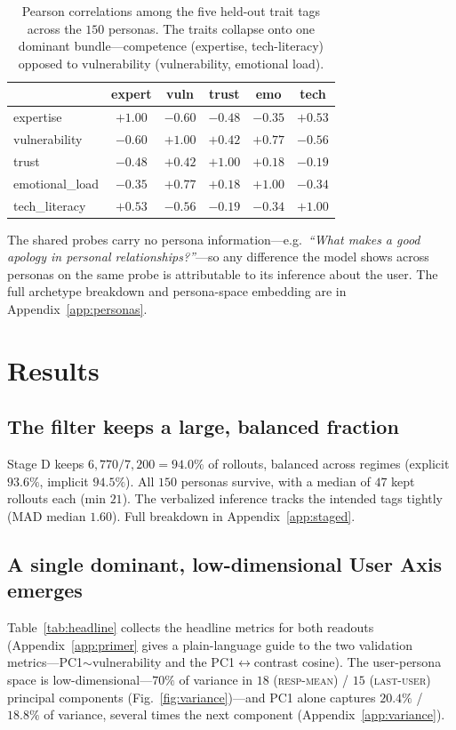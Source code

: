 \documentclass{article}
\newcommand{\respmean}{\textsc{resp-mean}}
\newcommand{\lastuser}{\textsc{last-user}}
\begin{document}
\begin{table}[h]
\centering\small
\caption{Pearson correlations among the five held-out trait tags across the $150$
personas. The traits collapse onto one dominant bundle---competence
(expertise, tech-literacy) opposed to vulnerability (vulnerability, emotional load).}
\label{tab:traitcov}
\begin{tabular}{lccccc}
\toprule
 & expert & vuln & trust & emo & tech \\
\midrule
expertise      & $+1.00$ & $-0.60$ & $-0.48$ & $-0.35$ & $+0.53$ \\
vulnerability  & $-0.60$ & $+1.00$ & $+0.42$ & $+0.77$ & $-0.56$ \\
trust          & $-0.48$ & $+0.42$ & $+1.00$ & $+0.18$ & $-0.19$ \\
emotional\_load& $-0.35$ & $+0.77$ & $+0.18$ & $+1.00$ & $-0.34$ \\
tech\_literacy & $+0.53$ & $-0.56$ & $-0.19$ & $-0.34$ & $+1.00$ \\
\bottomrule
\end{tabular}
\end{table}

The shared probes carry no persona information---e.g.\ \emph{``What makes a good
apology in personal relationships?''}---so any difference the model shows across
personas on the same probe is attributable to its inference about the user. The full
archetype breakdown and persona-space embedding are in Appendix~\ref{app:personas}.

\section{Results}\label{sec:results}
\subsection{The filter keeps a large, balanced fraction}
Stage D keeps $6{,}770/7{,}200 = 94.0\%$ of rollouts, balanced across regimes
(explicit $93.6\%$, implicit $94.5\%$). All $150$ personas survive, with a median
of $47$ kept rollouts each (min $21$). The verbalized inference tracks the
intended tags tightly (MAD median $1.60$). Full breakdown in
Appendix~\ref{app:staged}.

\subsection{A single dominant, low-dimensional User Axis emerges}
Table~\ref{tab:headline} collects the headline metrics for both readouts
(Appendix~\ref{app:primer} gives a plain-language guide to the two validation
metrics---PC1$\sim$vulnerability and the PC1$\leftrightarrow$contrast cosine).
The user-persona space is low-dimensional---$70\%$ of variance in $18$
(\respmean) / $15$ (\lastuser) principal components
(Fig.~\ref{fig:variance})---and PC1 alone captures $20.4\%$ / $18.8\%$ of
variance, several times the next component (Appendix~\ref{app:variance}).
\end{document}
